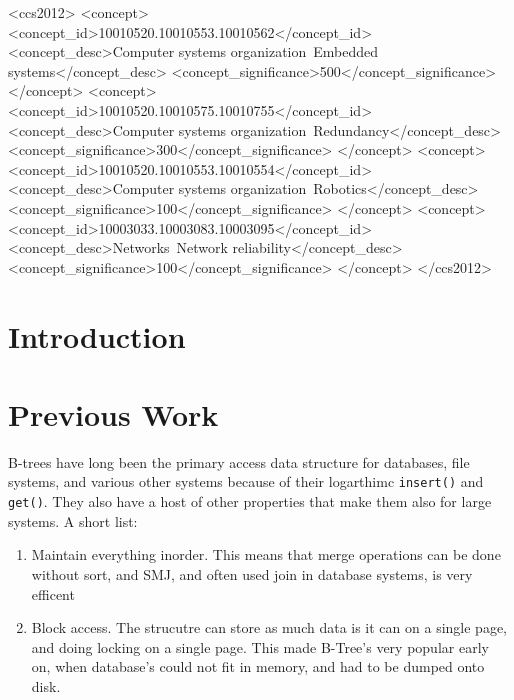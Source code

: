 \documentclass{sig-alternate}
\begin{document}
%
%
\begin{CCSXML}
<ccs2012>
 <concept>
  <concept_id>10010520.10010553.10010562</concept_id>
  <concept_desc>Computer systems organization~Embedded systems</concept_desc>
  <concept_significance>500</concept_significance>
 </concept>
 <concept>
  <concept_id>10010520.10010575.10010755</concept_id>
  <concept_desc>Computer systems organization~Redundancy</concept_desc>
  <concept_significance>300</concept_significance>
 </concept>
 <concept>
  <concept_id>10010520.10010553.10010554</concept_id>
  <concept_desc>Computer systems organization~Robotics</concept_desc>
  <concept_significance>100</concept_significance>
 </concept>
 <concept>
  <concept_id>10003033.10003083.10003095</concept_id>
  <concept_desc>Networks~Network reliability</concept_desc>
  <concept_significance>100</concept_significance>
 </concept>
</ccs2012>
\end{CCSXML}



%
%

%
%



\section{Introduction}

\section{Previous Work}
B-trees have long been the primary access data structure for databases, file systems, and various other systems because of their logarthimc \texttt{insert()} and \texttt{get()}.
They also have a host of other properties that make them also for large systems.  A short list: 
\begin{enumerate}
\item Maintain everything inorder.  This means that merge operations can be done without sort, and SMJ, and often used join in database systems, is very efficent
\item Block access.  The strucutre can store as much data is it can on a single page, and doing locking on a single page.  This made B-Tree's very popular early on, when database's could not fit in memory, and had to be dumped onto disk.
\end{enumerate}
\end{document}
